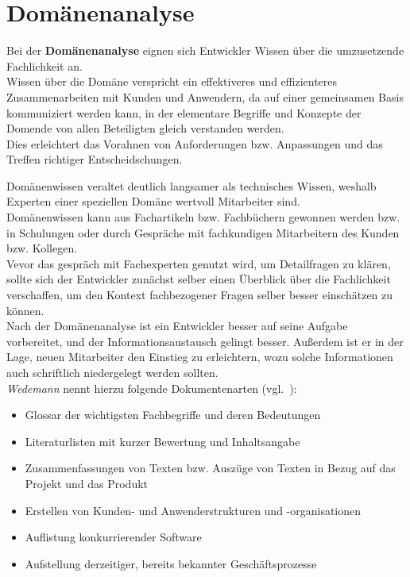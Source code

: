 \section{Domänenanalyse}\label{sec:domanenanalyse}

\noindent
Bei der \textbf{Domänenanalyse} eignen sich Entwickler Wissen über die umzusetzende Fachlichkeit an.\\

\noindent
Wissen über die Domäne verspricht ein effektiveres und effizienteres Zusammenarbeiten mit Kunden und Anwendern, da auf einer gemeinsamen Basis kommuniziert werden kann, in der elementare Begriffe und Konzepte der Domende von allen Beteiligten gleich verstanden werden.\\
Dies erleichtert das Vorahnen von Anforderungen bzw. Anpassungen und das Treffen richtiger Entscheidschungen.

\noindent
Domänenwissen veraltet deutlich langsamer als technisches Wissen, weshalb Experten einer speziellen Domäne wertvoll Mitarbeiter sind.\\

\noindent
Domänenwissen kann aus Fachartikeln bzw. Fachbüchern gewonnen werden bzw. in Schulungen oder durch Gespräche mit fachkundigen Mitarbeitern des Kunden bzw. Kollegen.\\
Vevor das gespräch mit Fachexperten genutzt wird, um Detailfragen zu klären, sollte sich der Entwickler zunächst selber einen Überblick über die Fachlichkeit verschaffen, um den Kontext fachbezogener Fragen selber besser einschätzen zu können.\\

\noindent
Nach der Domänenanalyse ist ein Entwickler besser auf seine Aufgabe vorbereitet, und der Informationsaustausch gelingt besser.
Außerdem ist er in der Lage, neuen Mitarbeiter den Einstieg zu erleichtern, wozu solche Informationen auch schriftlich niedergelegt werden sollten.\\
\textit{Wedemann} nennt hierzu folgende Dokumentenarten (vgl.~\cite[42]{Wed09}):

\begin{itemize}
    \item Glossar der wichtigsten Fachbegriffe und deren Bedeutungen
    \item Literaturlisten mit kurzer Bewertung und Inhaltsangabe
    \item Zusammenfassungen von Texten bzw. Auszüge von Texten in Bezug auf das Projekt und das Produkt
    \item Erstellen von Kunden- und Anwenderstrukturen und -organisationen
    \item Auflistung konkurrierender Software
    \item Aufstellung derzeitiger, bereits bekannter Geschäftsprozesse
\end{itemize}